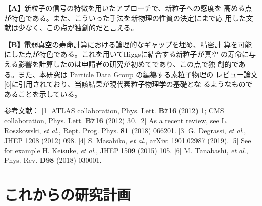 \documentclass[11pt,a4paper,twoside,dvipdfmx]{jsarticle}   %
\newcommand{\研究課題名}{粒子加速器を用いた電弱相互作用を持つ新物理の探索}
\newcommand{\研究機関名}{東京大学}
\newcommand{\申請者氏名}{千草颯}
\newcommand{\研究代表者氏名}{\申請者氏名}
\newcommand{\研究期間の最終元号年度}{34}	%
\begin{document}
{\vspace*{1mm}

\textbf{【A】}新粒子の信号の特徴を用いたアプローチで、新粒子への感度を
高める点が特色である。また、こういった手法を新物理の性質の決定にまで応
用した文献は少なく、この点が独創的だと言える。

\textbf{【B】}電弱真空の寿命計算における論理的なギャップを埋め、精密計
算を可能にした点が特色である。これを用いてHiggsに結合する新粒子が真空
の寿命に与える影響を計算したのは申請者の研究が初めてであり、この点で独
創的である。また、本研究は Particle Data Group の編纂する素粒子物理の
レビュー論文[6]に引用されており、当該結果が現代素粒子物理学の基礎とな
るようなものであることを示している。

\vspace*{1mm}
\begin{spacing}{0.8}
 \underline{参考文献}：
 [1] ATLAS collaboration, Phys. Lett. \textbf{B716} (2012) 1;
 CMS collaboration, Phys. Lett. \textbf{B716} (2012) 30.
 [2] As a recent review, see L. Roszkowski, \textit{et al}., Rept. Prog. Phys. \textbf{81} (2018) 066201.
 [3] G. Degrassi, \textit{et al}., JHEP 1208 (2012) 098.
 [4] S. Masahiko, \textit{et al}., arXiv: 1901.02987 (2019).
 [5] See for example H. Keisuke, \textit{et al}., JHEP 1509 (2015) 105.
 [6] M. Tanabashi, \textit{et al}., Phys. Rev. \textbf{D98} (2018) 030001.
\end{spacing}

}

\section{これからの研究計画}
\end{document}
